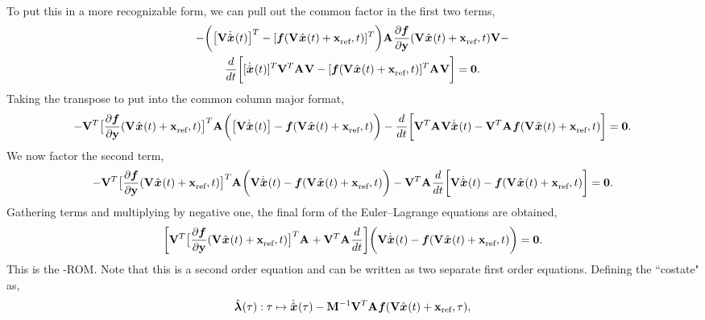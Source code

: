 \documentclass[3p,computermodern,10pt]{elsarticle}
\begin{document}
\begin{appendices}
\begin{multline*}
\end{multline*}
To put this in a more recognizable form, we can pull out the common factor in the first two terms,
\begin{multline*}
- \bigg( \big[ \mathbf {V} \dot{\hat{ \boldsymbol x}}^{}(t) \big]^T  -  [\boldsymbol f(\mathbf {V}^{} \hat{ \boldsymbol x}^{}(t) + \mathbf{x}_\text{ref}^{},t)] ^T \bigg) \mathbf{A}^{}
 \frac{\partial \boldsymbol f}{\partial \mathbf{y}}(\mathbf {V}^{} \hat{ \boldsymbol x}^{}(t) + \mathbf{x}_\text{ref}^{},t) \mathbf {V} -  \\
\frac{d}{dt} \bigg[  [\dot{\hat{ \boldsymbol x}}^{}(t)]^T \mathbf {V}^T \mathbf{A}^{} \mathbf {V} -  
[\boldsymbol f(\mathbf {V}^{} \hat{ \boldsymbol x}^{}(t) + \mathbf{x}_\text{ref}^{},t) ]^T \mathbf{A}^{} \mathbf {V}  \bigg] = \boldsymbol 0.
\end{multline*}
Taking the transpose to put into the common column major format,
$$ -  \mathbf {V}^T \big[ \frac{\partial \boldsymbol f}{\partial \mathbf{y}}(\mathbf {V}^{} \hat{ \boldsymbol x}^{}(t) + \mathbf{x}_\text{ref}^{},t)  \big]^T \mathbf{A}^{} \bigg( \big[ \mathbf {V} \dot{\hat{ \boldsymbol x}}^{}(t)\big]  -  \boldsymbol f(\mathbf {V}^{} \hat{ \boldsymbol x}^{}(t) + \mathbf{x}_\text{ref}^{},t)  \bigg) -  \frac{d}{dt} \bigg[  \mathbf {V}^T \mathbf{A}^{} \mathbf {V} \dot{\hat{ \boldsymbol x}}^{}(t)  - \mathbf {V}^T \mathbf{A}^{} \boldsymbol f(\mathbf {V}^{} \hat{ \boldsymbol x}^{}(t) + \mathbf{x}_\text{ref}^{},t)   \bigg] = \boldsymbol 0.
 $$
We now factor the second term,
$$ -  \mathbf {V}^T \big[ \frac{\partial \boldsymbol f}{\partial \mathbf{y}}(\mathbf {V}^{} \hat{ \boldsymbol x}^{}(t) + \mathbf{x}_\text{ref}^{},t)  \big]^T \mathbf{A}^{ } \bigg(  \mathbf {V} \dot{\hat{ \boldsymbol x}}^{ }(t)  -  \boldsymbol f(\mathbf {V}^{} \hat{ \boldsymbol x}^{}(t) + \mathbf{x}_\text{ref}^{},t) \bigg) -  \mathbf {V}^T \mathbf{A}^{ } \frac{d}{dt} \bigg[   \mathbf {V} \dot{\hat{ \boldsymbol x}}^{}(t)  - \boldsymbol f(\mathbf {V}^{} \hat{ \boldsymbol x}^{}(t) + \mathbf{x}_\text{ref}^{},t) \bigg] = \boldsymbol 0. $$
Gathering terms and multiplying by negative one, the final form of the Euler--Lagrange equations are obtained,
\begin{equation}\label{eq:el_secondorder}
 \bigg[\mathbf {V}^T \big[\frac{\partial \boldsymbol f}{\partial \mathbf{y}}(\mathbf {V}^{} \hat{ \boldsymbol x}^{}(t) + \mathbf{x}_\text{ref}^{},t) \big]^T \mathbf{A}^{} + \mathbf {V}^T \mathbf{A}^{} \frac{d}{dt} \bigg] \bigg(  \mathbf {V} \dot{\hat{ \boldsymbol x}}^{}(t) -  \boldsymbol f(\mathbf {V}^{} \hat{ \boldsymbol x}^{}(t) + \mathbf{x}_\text{ref}^{},t) \bigg) = \boldsymbol 0.
\end{equation} 
This is the \methodAcronym-ROM. Note that this is a second order equation and can be written as two separate first order equations. Defining the ``costate" as,
\begin{equation*}
\hat{\boldsymbol \lambda}^{}(\tau)  : \tau \mapsto \dot{\hat{ \boldsymbol x}}^{}(\tau)  -  \mathbf{M}^{-1} \mathbf {V}^T \mathbf{A}^{} \boldsymbol f(\mathbf {V} \hat{ \boldsymbol x}^{}(t) + \mathbf{x}_\text{ref}, \tau) ,
\end{equation*}

\end{appendices}
\end{document}
